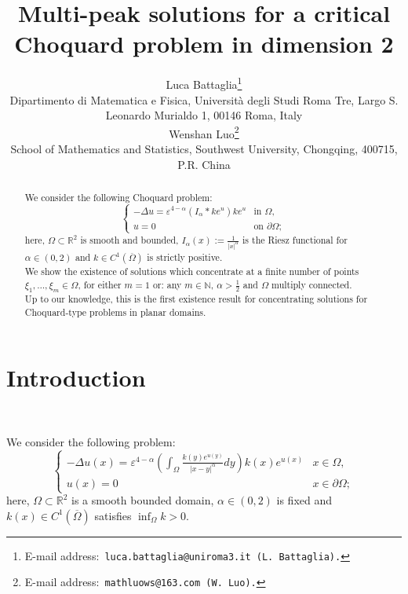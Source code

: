 \documentclass[11pt]{article}
\begin{document}
\title{Multi-peak solutions for a critical Choquard problem in dimension 2}

\author{Luca Battaglia\footnote{E-mail address:\tt{ luca.battaglia@uniroma3.it} (L. Battaglia).}\\
\footnotesize Dipartimento di Matematica e Fisica, Universit\`a degli Studi Roma Tre, Largo S. Leonardo Murialdo 1, 00146 Roma, Italy\\
Wenshan Luo\footnote{E-mail address:\tt{ mathluows@163.com} (W. Luo).}\\
\footnotesize School of Mathematics and Statistics, Southwest University, Chongqing, 400715, P.R. China}
\date{}
\maketitle

\begin{abstract}
We consider the following Choquard problem:
$$\left\{\begin{array}{ll}-\Delta u=\varepsilon^{4-\alpha}(I_\alpha\ast ke^u)ke^u&\text{in }\Omega,\\u=0&\text{on }\partial\Omega;\end{array}\right.$$
here, $\Omega\subset\mathbb R^2$ is smooth and bounded, $I_\alpha(x):=\frac1{|x|^\alpha}$ is the Riesz functional for $\alpha\in(0,2)$ and $k\in C^1\left(\overline\Omega\right)$ is strictly positive.\\
We show the existence of solutions which concentrate at a finite number of points $\xi_1,\dots,\xi_m\in\Omega$, for either $m=1$ or: any $m\in\mathbb N$, $\alpha>\frac12$ and $\Omega$ multiply connected.\\
Up to our knowledge, this is the first existence result for concentrating solutions for Choquard-type problems in planar domains.
\end{abstract}

\section{Introduction}\

We consider the following problem:
\begin{equation}\label{eq. original problem}
\boxed{\left\{\begin{array}{ll}-\Delta u(x)=\varepsilon^{4-\alpha}\left(\int_\Omega\frac{k(y)e^{u(y)}}{|x-y|^\alpha}dy\right)k(x)e^{u(x)}&x\in\Omega,\\u(x)=0&x\in\partial\Omega;\end{array}\right.}
\end{equation}
here, $\Omega\subset\mathbb R^2$ is a smooth bounded domain, $\alpha\in(0,2)$ is fixed and $k(x)\in C^1\left(\overline\Omega\right)$ satisfies $\inf_\Omega k>0$.\\
\end{document}
